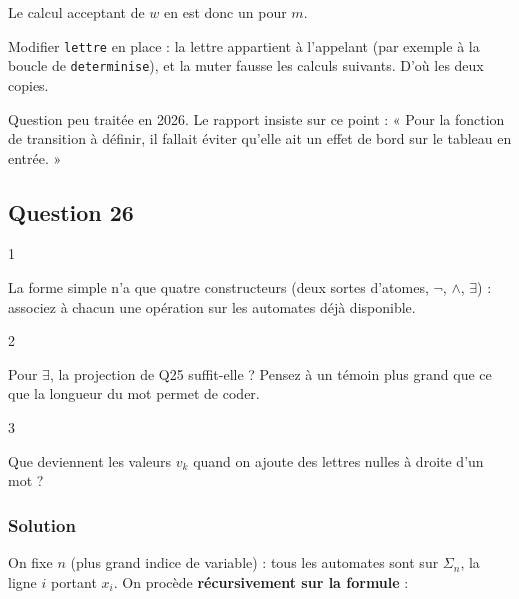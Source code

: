 \documentclass[11pt,a4paper]{article}
\begin{document}
Le calcul acceptant de \(w\) en est donc un pour \(m\).

\begin{piege}

Modifier \texttt{lettre} en place : la lettre appartient à l'appelant (par exemple à la boucle de \texttt{determinise}), et la muter fausse les calculs suivants. D'où les deux copies.

\end{piege}

\begin{jury}

Question peu traitée en 2026. Le rapport insiste sur ce point : « Pour la fonction de transition à définir, il fallait éviter qu'elle ait un effet de bord sur le tableau en entrée. »

\end{jury}

\hypertarget{question-26}{%
\subsection{Question 26}\label{question-26}}

\begin{indication}{1}

La forme simple n'a que quatre constructeurs (deux sortes d'atomes, \(\neg\), \(\wedge\), \(\exists\)) : associez à chacun une opération sur les automates déjà disponible.

\end{indication}

\begin{indication}{2}

Pour \(\exists\), la projection de Q25 suffit-elle ? Pensez à un témoin plus grand que ce que la longueur du mot permet de coder.

\end{indication}

\begin{indication}{3}

Que deviennent les valeurs \(v_k\) quand on ajoute des lettres nulles à droite d'un mot ?

\end{indication}

\hypertarget{solution-25}{%
\subsubsection{Solution}\label{solution-25}}

On fixe \(n\) (plus grand indice de variable) : tous les automates sont sur \(\Sigma_n\), la ligne \(i\) portant \(x_i\). On procède \textbf{récursivement sur la formule} :
\end{document}
